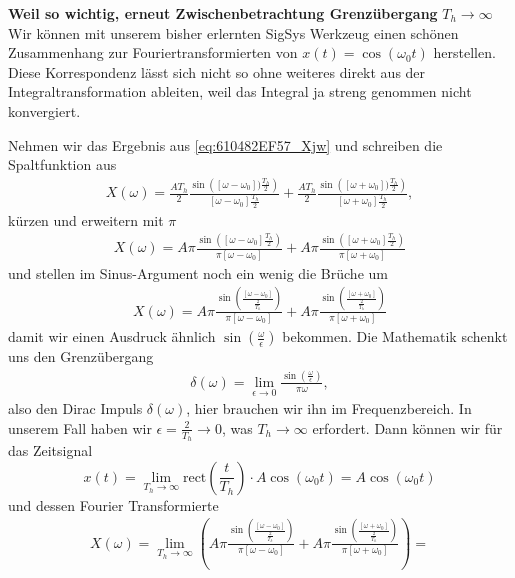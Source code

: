 \begin{mdframed}
\textbf{Weil so wichtig, erneut Zwischenbetrachtung Grenzübergang} $T_h\to\infty$ Wir können mit
unserem bisher erlernten SigSys Werkzeug
einen schönen Zusammenhang zur Fouriertransformierten von $x(t)=\cos(\omega_0 t)$
herstellen.
Diese Korrespondenz lässt sich nicht so ohne weiteres direkt aus der Integraltransformation
ableiten, weil das Integral ja streng genommen nicht konvergiert.
%

Nehmen wir das Ergebnis aus \ref{eq:610482EF57_Xjw} und schreiben die Spaltfunktion
aus
\begin{align}
X(\omega) =
\frac{A T_h}{2} \frac{\sin\left([\omega-\omega_0]) \frac{T_h}{2}\right)}{[\omega-\omega_0] \frac{T_h}{2}} +
\frac{A T_h}{2} \frac{\sin\left([\omega+\omega_0]) \frac{T_h}{2}\right)}{[\omega+\omega_0] \frac{T_h}{2}},
\end{align}
kürzen und erweitern mit $\pi$
\begin{align}
X(\omega) =
A \pi \frac{\sin\left([\omega-\omega_0] \frac{T_h}{2}\right)}{\pi [\omega-\omega_0]} +
A \pi \frac{\sin\left([\omega+\omega_0] \frac{T_h}{2}\right)}{\pi [\omega+\omega_0]}
\end{align}
und stellen im Sinus-Argument noch ein wenig die Brüche um
\begin{align}
X(\omega) =
A \pi \frac{\sin\left( \frac{[\omega-\omega_0]}{\frac{2}{T_h}}  \right)}{\pi [\omega-\omega_0]} +
A \pi \frac{\sin\left( \frac{[\omega+\omega_0]}{\frac{2}{T_h}}  \right)}{\pi [\omega+\omega_0]}
\end{align}
damit wir einen Ausdruck ähnlich $\sin(\frac{\omega}{\epsilon})$ bekommen.
%
Die Mathematik schenkt uns den Grenzübergang
\begin{align}
\delta(\omega) = \lim_{\epsilon\to 0} \frac{\sin(\frac{\omega}{\epsilon})}{\pi \omega},
\end{align}
also den Dirac Impuls $\delta(\omega)$, hier brauchen wir ihn im Frequenzbereich.
%
In unserem Fall haben wir $\epsilon=\frac{2}{T_h} \to 0$, was $T_h\to \infty$
erfordert.
Dann können wir für das Zeitsignal
\begin{equation}
x(t) = \lim_{T_h\to\infty} \mathrm{rect}(\frac{t}{T_h}) \cdot A \cos(\omega_0 t) =
A \cos(\omega_0 t)
\end{equation}
und dessen Fourier Transformierte
\begin{align}
X(\omega) =
\lim_{T_h\to\infty}
\left(A \pi \frac{\sin\left( \frac{[\omega-\omega_0]}{\frac{2}{T_h}}  \right)}{\pi [\omega-\omega_0]} +
A \pi \frac{\sin\left( \frac{[\omega+\omega_0]}{\frac{2}{T_h}}  \right)}{\pi [\omega+\omega_0]} \right)=

\end{align}
\end{mdframed}
